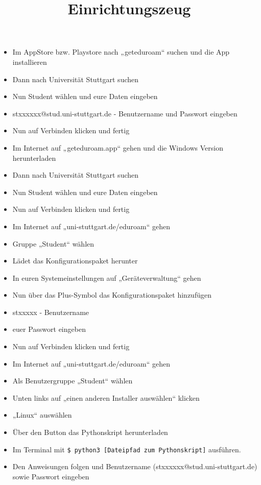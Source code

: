 \documentclass{../../sheet}
\title{Einrichtungszeug}
\begin{document}
\maketitle

\begin{itemize}
  \item Im AppStore bzw. Playstore nach „geteduroam“ suchen und die App installieren
  \item Dann nach Universität Stuttgart suchen
  \item Nun Student wählen und eure Daten eingeben
  \item stxxxxxx@stud.uni-stuttgart.de - Benutzername und Passwort eingeben
  \item Nun auf Verbinden klicken und fertig
\end{itemize}

\begin{itemize}
  \item Im Internet auf „geteduroam.app“ gehen und die Windows Version herunterladen
  \item Dann nach Universität Stuttgart suchen
  \item Nun Student wählen und eure Daten eingeben
  \item Nun auf Verbinden klicken und fertig
\end{itemize}

\begin{itemize}
  \item Im Internet auf „uni-stuttgart.de/eduroam“ gehen
  \item Gruppe „Student“ wählen
  \item Lädet das Konfigurationspaket herunter
  \item In euren Systemeinstellungen auf „Geräteverwaltung“ gehen
  \item Nun über das Plus-Symbol das Konfigurationspaket hinzufügen
  \item stxxxxx - Benutzername
  \item euer Passwort eingeben
  \item Nun auf Verbinden klicken und fertig
\end{itemize}
\newpage
{}
\begin{itemize}
  \item Im Internet auf „uni-stuttgart.de/eduroam“ gehen
  \item Als Benutzergruppe „Student“ wählen
  \item Unten links auf „einen anderen Installer auswählen“ klicken
  \item „Linux“ auswählen
  \item Über den Button das Pythonskript herunterladen
  \item Im Terminal mit \texttt{\$ python3 [Dateipfad zum Pythonskript]} ausführen.
  \item Den Anweisungen folgen und Benutzername (stxxxxxx@stud.uni-stuttgart.de) sowie Passwort eingeben
\end{itemize}
\end{document}
